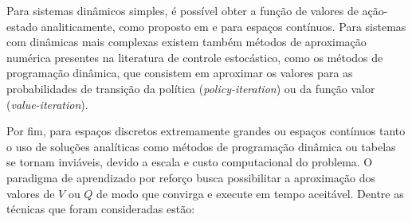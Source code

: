 Para sistemas dinâmicos simples, é possível obter a função de valores de ação-estado analiticamente, como proposto em \citep{Avellaneda2008} e \citep{rao2020stochastic} para espaços contínuos. Para sistemas com dinâmicas mais complexas existem também métodos de aproximação numérica presentes na literatura de controle estocástico, como os métodos de programação dinâmica, que consistem em aproximar os valores para as probabilidades de transição da política (\textit{policy-iteration}) ou da função valor (\textit{value-iteration}).

Por fim, para espaços discretos extremamente grandes ou espaços contínuos tanto o uso de soluções analíticas como métodos de programação dinâmica ou tabelas se tornam inviáveis, devido a escala e custo computacional do problema. O paradigma de aprendizado por reforço busca possibilitar a aproximação dos valores de $V$ ou $Q$ de modo que convirga e execute em tempo aceitável.  Dentre as técnicas que foram consideradas estão:
